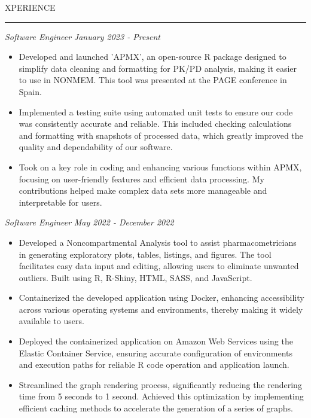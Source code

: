 \documentclass[11pt]{article}
\begin{document}
\par \scalebox{1.3}{E}XPERIENCE                    
\par \vspace{-0.1in} \noindent\rule{7.8in}{0.5pt} 
\textbf{\scalebox{1.2}{Amador Bioscience}} \hfill \scalebox{1.1}{Ann Arbor, Michigan}
\par \textit{Software Engineer} \hfill \textit{January 2023 - Present}
{\small
\begin{itemize}
    \item Developed and launched 'APMX', an open-source R package designed to simplify data cleaning and formatting for PK/PD analysis, making it easier to use in NONMEM. This tool was presented at the PAGE conference in Spain.
    \item Implemented a testing suite using automated unit tests to ensure our code was consistently accurate and reliable. This included checking calculations and formatting with snapshots of processed data, which greatly improved the quality and dependability of our software.
    \item Took on a key role in coding and enhancing various functions within APMX, focusing on user-friendly features and efficient data processing. My contributions helped make complex data sets more manageable and interpretable for users.
\end{itemize}
}

\textbf{\scalebox{1.2}{Ann Arbor Pharmacometrics Group}} \hfill \scalebox{1.1}{Ann Arbor, Michigan}
\par \textit{Software Engineer} \hfill \textit{May 2022 - December 2022}
{
\small
\begin{itemize}
    \item Developed a Noncompartmental Analysis tool to assist pharmacometricians in generating exploratory plots, tables, listings, and figures. The tool facilitates easy data input and editing, allowing users to eliminate unwanted outliers. Built using R, R-Shiny, HTML, SASS, and JavaScript.
    \item Containerized the developed application using Docker, enhancing accessibility across various operating systems and environments, thereby making it widely available to users.
    \item Deployed the containerized application on Amazon Web Services using the Elastic Container Service, ensuring accurate configuration of environments and execution paths for reliable R code operation and application launch.
    \item Streamlined the graph rendering process, significantly reducing the rendering time from 5 seconds to 1 second. Achieved this optimization by implementing efficient caching methods to accelerate the generation of a series of graphs.
\end{itemize}
}
\end{document}
